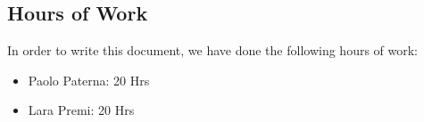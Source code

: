\documentclass[12pt,a4paper]{article}
\begin{document}
	
	\tableofcontents
	
	
	\subsection{Hours of Work}
	In order to write this document, we have done the following hours of work:
	\begin{itemize}
	\item Paolo Paterna: 20 Hrs
	\item Lara Premi: 20 Hrs
	\end{itemize}
\end{document}
